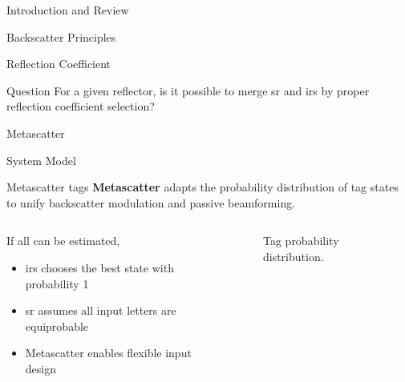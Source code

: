 \documentclass[9pt]{beamer}
\begin{document}
\begin{section}{Introduction and Review}
\begin{subsection}{Backscatter Principles}
\begin{frame}{Reflection Coefficient}
				\begin{block}{Question}
					For a given reflector, is it possible to merge \gls{sr} and \gls{irs} by proper reflection coefficient selection?
				\end{block}
			\end{frame}
		\end{subsection}
	\end{section}

	\begin{section}{Metascatter}
		\begin{subsection}{System Model}
			\begin{frame}{Metascatter tags}
				\textbf{Metascatter} adapts the \alert{probability distribution} of tag states to unify backscatter modulation and passive beamforming.
				\begin{columns}
					\begin{column}{0.625\columnwidth}
						If all  can be estimated,
						\begin{itemize}
							\item \gls{irs} chooses the best state with probability \num{1}
							\item \gls{sr} assumes all input letters are equiprobable
							\item Metascatter enables flexible input design
						\end{itemize}
					\end{column}
					\begin{column}{0.375\columnwidth}
						\begin{figure}[!t]
							\centering
							\caption{Tag probability distribution.}
						\end{figure}
					\end{column}
				\end{columns}
			\end{frame}


\end{subsection}
\end{section}
\end{document}
